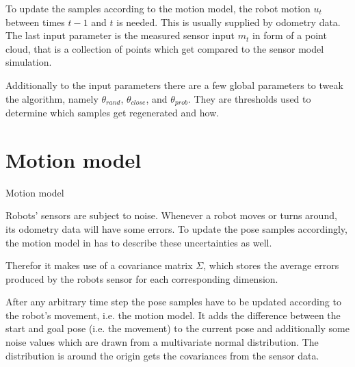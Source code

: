 \documentclass[Thesis.tex]{subfiles}
\begin{document}
To update the samples according to the motion model, the robot motion $u_{t}$ between times $t-1$ and $t$ is needed. This is usually supplied by odometry data. The last input parameter is the measured sensor input $m_{t}$ in form of a point cloud, that is a collection of points which get compared to the sensor model simulation.

Additionally to the input parameters there are a few global parameters to tweak the algorithm, namely $\theta_{rand}$, $\theta_{close}$, and $\theta_{prob}$. They are thresholds used to determine which samples get regenerated and how.
%
%
%
%
%
%
\section{Motion model}\label{sec:motion_model_section}
%
\begin{algorithm}[!htp]
\caption{Motion model}
\label{alg:motionmodel}

\end{algorithm}
%
Robots' sensors are subject to noise. Whenever a robot moves or turns around, its odometry data will have some errors.
To update the pose samples accordingly, the motion model in  has to describe these uncertainties as well.

Therefor it makes use of a covariance matrix $\Sigma$, which stores the average errors produced by the robots sensor for each corresponding dimension.

After any arbitrary time step the pose samples have to be updated according to the robot's movement, i.e. the motion model. It adds the difference between the start and goal pose (i.e. the movement) to the current pose and additionally some noise values which are drawn from a multivariate normal distribution. The distribution is around the origin gets the covariances from the sensor data. 
\end{document}
